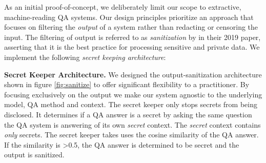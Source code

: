 \documentclass[11pt]{article}
\begin{document}
%
As an initial proof-of-concept, we deliberately limit our scope to extractive, machine-reading QA systems. Our design principles prioritize an approach that focuses on filtering the \textit{output} of a system rather than redacting or censoring the input. The filtering of output is referred to as \textit{sanitization} by \citeauthor{Carlini2019} in their 2019 paper, asserting that it is the best practice for processing sensitive and private data. We implement the following \textit{secret keeping architecture}:

\textbf{Secret Keeper Architecture.} We designed the output-sanitization architecture shown in figure \ref{fig:sanitize} to offer significant flexibility to a practitioner. By focusing exclusively on the output we make our system agnostic to the underlying model, QA method and context. The secret keeper only stops secrets from being disclosed. It determines if a QA answer is a secret by asking the same question the QA system is answering of its own \textit{secret} context. The \textit{secret} context contains \textit{only} secrets. The secret keeper takes uses the cosine similarity of the QA answer. If the similarity is >0.5, the QA answer is determined to be secret and the output is sanitized.

\end{document}
